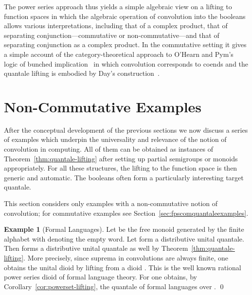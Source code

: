 \documentclass[12pt]{article}
\theoremstyle{definition}
\newtheorem{example}{Example}
\newcommand{\refthm}[1]{Theorem~\ref{#1}}
\begin{document}
The power series approach thus yields a simple algebraic view on a
lifting to function spaces in which the algebraic operation of
convolution into the booleans allows various interpretations,
including that of a complex product, that of separating
conjunction---commutative or non-commutative---and that of separating
conjunction as a complex product. In the commutative setting it gives
a simple account of the category-theoretical approach to O'Hearn and
Pym's logic of bunched implication~\cite{OHearnP99} in which
convolution corresponds to coends and the quantale lifting is embodied
by Day's construction~\cite{Day}.



\section{Non-Commutative Examples}\label{sec:fpsquantaleexamples}

After the conceptual development of the previous sections we now
discuss a series of examples which underpin the universality and
relevance of the notion of convolution in computing. All of them can
be obtained as instances of \refthm{thm:quantale-lifting} after
setting up partial semigroups or monoids appropriately. For all these
structures, the lifting to the function space is then generic and
automatic. The booleans often form a particularly interesting target
quantale.

This section considers only examples with a non-commutative notion of
convolution; for commutative examples see Section~\ref{sec:fpscomquantaleexamples}.

\begin{example}[Formal Languages]\label{ex:formal-languages}
  Let  be the free monoid generated by
  the finite alphabet  with  denoting the empty
  word. Let  form a distributive unital quantale. Then
   forms a distributive unital quantale as well by
  Theorem~\ref{thm:quantale-lifting}. More precisely, since suprema in
  convolutions are always finite, one obtains the unital dioid
   by lifting from a dioid
  . This is the well known rational power series
  dioid of formal language theory. For  one obtains, by
  Corollary~\ref{cor:powerset-lifting}, the quantale
   of formal languages over . \qed
\end{example}
\end{document}
